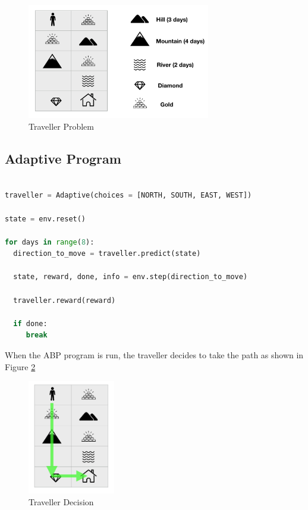 \documentclass[conference]{IEEEtran}
\begin{document}


\begin{figure}[h]
  \includegraphics[width=8cm]{traveller_example}
  \caption{Traveller Problem}
  \label{fig:traveller_example}
\end{figure}

\subsection{Adaptive Program} %



\begin{lstlisting}[language = Python,
                   label = {lst:abp_traveller},
                   caption = {Adaptive Program for traveller problem},
                   captionpos = b]

traveller = Adaptive(choices = [NORTH, SOUTH, EAST, WEST])

state = env.reset()

for days in range(8):
  direction_to_move = traveller.predict(state)

  state, reward, done, info = env.step(direction_to_move)

  traveller.reward(reward)

  if done:
     break

\end{lstlisting}


When the ABP program is run, the traveller decides to take the path as shown in Figure \ref{fig:traveller_decision}


\begin{figure}[h]
  \centering
  \includegraphics[height=5cm]{traveller_decision}
  \caption{Traveller Decision}
  \label{fig:traveller_decision}
\end{figure}
\end{document}
